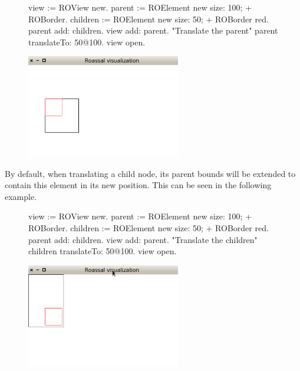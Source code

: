 \documentclass[a4paper,10pt,twoside]{book}
\begin{document}
\begin{figure}[H]
      \begin{minipage}[t]{0.5\textwidth}
      \vspace{0pt}
\begin{code}{}
view := ROView new.
parent := ROElement new 
				size: 100;
				+ ROBorder.
children := ROElement new 
				size: 50;
				+ ROBorder red.
parent add: children.
view add: parent.
"Translate the parent"
parent translateTo: 50@100.
view open.
\end{code}
   \end{minipage}
   \hfill
   \begin{minipage}[t]{0.6\textwidth}
      \vspace{0pt} \raggedright
       \centering
		\includegraphics[width=0.6\textwidth]{ex5}
   \end{minipage}
\label{fig:ex5}
\end{figure}

By default, when translating a child node, its parent bounds will be extended to contain this element in its new position. This can be seen in the following example.

\begin{figure}[H]
      \begin{minipage}[t]{0.5\textwidth}
      \vspace{0pt}
\begin{code}{}
view := ROView new.
parent := ROElement new 
				size: 100;
				+ ROBorder.
children := ROElement new 
				size: 50;
				+ ROBorder red.
parent add: children.
view add: parent.
"Translate the children"
children translateTo: 50@100.
view open.
\end{code}
   \end{minipage}
   \hfill
   \begin{minipage}[t]{0.6\textwidth}
      \vspace{0pt} \raggedright
       \centering
		\includegraphics[width=0.6\textwidth]{ex6}
   \end{minipage}
\label{fig:ex6}
\end{figure}
\end{document}
